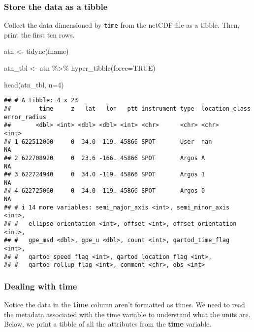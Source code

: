 \documentclass[
]{book}
\newenvironment{Shaded}{\begin{snugshade}}{\end{snugshade}}
\newcommand{\AttributeTok}[1]{\textcolor[rgb]{0.77,0.63,0.00}{#1}}
\newcommand{\ConstantTok}[1]{\textcolor[rgb]{0.00,0.00,0.00}{#1}}
\newcommand{\DecValTok}[1]{\textcolor[rgb]{0.00,0.00,0.81}{#1}}
\newcommand{\FunctionTok}[1]{\textcolor[rgb]{0.00,0.00,0.00}{#1}}
\newcommand{\NormalTok}[1]{#1}
\newcommand{\OtherTok}[1]{\textcolor[rgb]{0.56,0.35,0.01}{#1}}
\newcommand{\SpecialCharTok}[1]{\textcolor[rgb]{0.00,0.00,0.00}{#1}}
\begin{document}
\hypertarget{store-the-data-as-a-tibble}{%
\subsubsection{Store the data as a tibble}\label{store-the-data-as-a-tibble}}

Collect the data dimensioned by \texttt{time} from the netCDF file as a tibble. Then, print the first ten rows.

\begin{Shaded}
\begin{Highlighting}[]
\NormalTok{atn }\OtherTok{\textless{}{-}} \FunctionTok{tidync}\NormalTok{(fname)}

\NormalTok{atn\_tbl }\OtherTok{\textless{}{-}}\NormalTok{ atn }\SpecialCharTok{\%\textgreater{}\%} \FunctionTok{hyper\_tibble}\NormalTok{(}\AttributeTok{force=}\ConstantTok{TRUE}\NormalTok{)}

\FunctionTok{head}\NormalTok{(atn\_tbl, }\AttributeTok{n=}\DecValTok{4}\NormalTok{)}
\end{Highlighting}
\end{Shaded}

\begin{verbatim}
## # A tibble: 4 x 23
##        time     z   lat   lon   ptt instrument type  location_class error_radius
##       <dbl> <int> <dbl> <dbl> <int> <chr>      <chr> <chr>                 <int>
## 1 622512000     0  34.0 -119. 45866 SPOT       User  nan                      NA
## 2 622708920     0  23.6 -166. 45866 SPOT       Argos A                        NA
## 3 622724940     0  34.0 -119. 45866 SPOT       Argos 1                        NA
## 4 622725060     0  34.0 -119. 45866 SPOT       Argos 0                        NA
## # i 14 more variables: semi_major_axis <int>, semi_minor_axis <int>,
## #   ellipse_orientation <int>, offset <int>, offset_orientation <int>,
## #   gpe_msd <dbl>, gpe_u <dbl>, count <int>, qartod_time_flag <int>,
## #   qartod_speed_flag <int>, qartod_location_flag <int>,
## #   qartod_rollup_flag <int>, comment <chr>, obs <int>
\end{verbatim}

\hypertarget{dealing-with-time}{%
\subsubsection{Dealing with time}\label{dealing-with-time}}

Notice the data in the \textbf{time} column aren't formatted as times. We need to read the metadata associated with the time variable to understand what the units are. Below, we print a tibble of all the attributes from the \textbf{time} variable.
\end{document}
